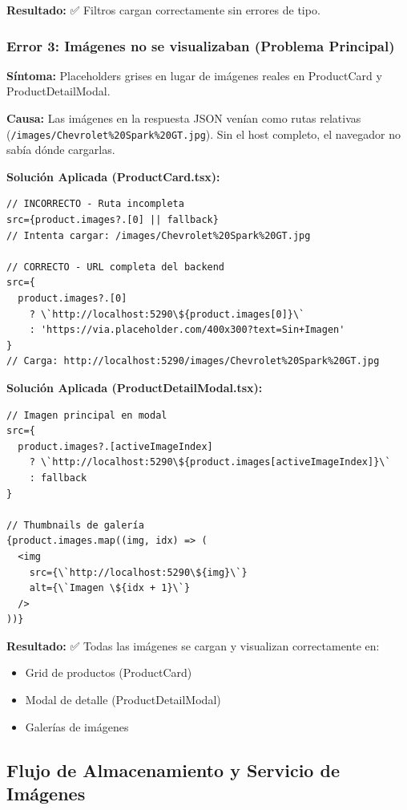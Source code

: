 \documentclass[12pt,a4paper]{article}
\begin{document}
\textbf{Resultado:} ✅ Filtros cargan correctamente sin errores de tipo.

\subsubsection{Error 3: Imágenes no se visualizaban (Problema Principal)}

\textbf{Síntoma:}
Placeholders grises en lugar de imágenes reales en ProductCard y ProductDetailModal.

\textbf{Causa:}
Las imágenes en la respuesta JSON venían como rutas relativas (\texttt{/images/Chevrolet\%20Spark\%20GT.jpg}). Sin el host completo, el navegador no sabía dónde cargarlas.

\textbf{Solución Aplicada (ProductCard.tsx):}
\begin{lstlisting}
// INCORRECTO - Ruta incompleta
src={product.images?.[0] || fallback}
// Intenta cargar: /images/Chevrolet%20Spark%20GT.jpg

// CORRECTO - URL completa del backend
src={
  product.images?.[0] 
    ? \`http://localhost:5290\${product.images[0]}\`
    : 'https://via.placeholder.com/400x300?text=Sin+Imagen'
}
// Carga: http://localhost:5290/images/Chevrolet%20Spark%20GT.jpg
\end{lstlisting}

\textbf{Solución Aplicada (ProductDetailModal.tsx):}
\begin{lstlisting}
// Imagen principal en modal
src={
  product.images?.[activeImageIndex] 
    ? \`http://localhost:5290\${product.images[activeImageIndex]}\`
    : fallback
}

// Thumbnails de galería
{product.images.map((img, idx) => (
  <img 
    src={\`http://localhost:5290\${img}\`}
    alt={\`Imagen \${idx + 1}\`}
  />
))}
\end{lstlisting}

\textbf{Resultado:} ✅ Todas las imágenes se cargan y visualizan correctamente en:
\begin{itemize}
    \item Grid de productos (ProductCard)
    \item Modal de detalle (ProductDetailModal)
    \item Galerías de imágenes
\end{itemize}

\subsection{Flujo de Almacenamiento y Servicio de Imágenes}
\end{document}
